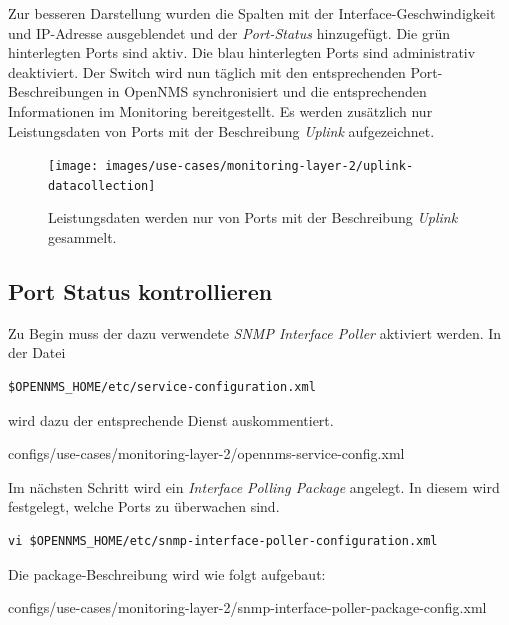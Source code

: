 Zur besseren Darstellung wurden die Spalten mit der Interface-Geschwindigkeit und IP-Adresse ausgeblendet und der \emph{Port-Status} hinzugefügt. Die grün hinterlegten Ports sind aktiv. Die blau hinterlegten Ports sind administrativ deaktiviert. Der Switch wird nun täglich  mit den entsprechenden Port-Beschreibungen in OpenNMS synchronisiert und die entsprechenden Informationen im Monitoring bereitgestellt. Es werden zusätzlich nur Leistungsdaten von Ports mit der Beschreibung \emph{Uplink} aufgezeichnet.

\begin{figure}[H]
	\centering
	\texttt{[image: images/use-cases/monitoring-layer-2/uplink-datacollection]}
	\caption{Leistungsdaten werden nur von Ports mit der Beschreibung \emph{Uplink} gesammelt.}
	\label{pic:uplink-datacollection}
\end{figure}

\subsection{Port Status kontrollieren}
Zu Begin muss der dazu verwendete \emph{SNMP Interface Poller} aktiviert werden. In der Datei

\begin{lstlisting}[numbers=none]
$OPENNMS_HOME/etc/service-configuration.xml
\end{lstlisting}

wird dazu der entsprechende Dienst auskommentiert.


  {configs/use-cases/monitoring-layer-2/opennms-service-config.xml}

Im nächsten Schritt wird ein \emph{Interface Polling Package} angelegt. In diesem wird festgelegt, welche Ports zu überwachen sind.

\begin{lstlisting}[numbers=none]
vi $OPENNMS_HOME/etc/snmp-interface-poller-configuration.xml
\end{lstlisting}

Die package-Beschreibung wird wie folgt aufgebaut:


  {configs/use-cases/monitoring-layer-2/snmp-interface-poller-package-config.xml}

